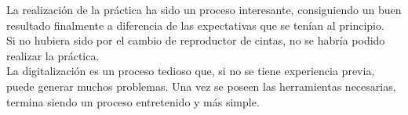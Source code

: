 \documentclass{article}
\begin{document}
La realización de la práctica ha sido un proceso interesante, consiguiendo un buen resultado finalmente a diferencia de las expectativas que se tenían al principio. \\

Si no hubiera sido por el cambio de reproductor de cintas, no se habría podido realizar la práctica.\\

La digitalización es un proceso tedioso que, si no se tiene experiencia previa, puede generar muchos problemas. Una vez se poseen las herramientas necesarias, termina siendo un proceso entretenido y más simple.
\end{document}
